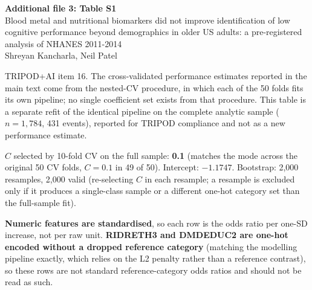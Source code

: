 \documentclass[11pt]{article}
\title{}
\date{}
\begin{document}
\begin{center}
{\large\bfseries Additional file 3: Table S1}\\[2pt]
{\small Blood metal and nutritional biomarkers did not improve identification of low cognitive performance beyond demographics in older US adults: a pre-registered analysis of NHANES 2011-2014}\\[2pt]
{\small Shreyan Kancharla, Neil Patel}
\end{center}

\bigskip

TRIPOD+AI item 16. The cross-validated performance estimates reported in the main text come from the nested-CV procedure, in which each of the 50 folds fits its own pipeline; no single coefficient set exists from that procedure. This table is a separate refit of the identical pipeline on the complete analytic sample ($n=1{,}784$, 431 events), reported for TRIPOD compliance and not as a new performance estimate.

$C$ selected by 10-fold CV on the full sample: \textbf{0.1} (matches the mode across the original 50 CV folds, $C=0.1$ in 49 of 50). Intercept: $-1.1747$. Bootstrap: 2,000 resamples, 2,000 valid (re-selecting $C$ in each resample; a resample is excluded only if it produces a single-class sample or a different one-hot category set than the full-sample fit).

\textbf{Numeric features are standardised}, so each row is the odds ratio per one-SD increase, not per raw unit. \textbf{RIDRETH3 and DMDEDUC2 are one-hot encoded without a dropped reference category} (matching the modelling pipeline exactly, which relies on the L2 penalty rather than a reference contrast), so these rows are not standard reference-category odds ratios and should not be read as such.

\footnotesize
\end{document}
